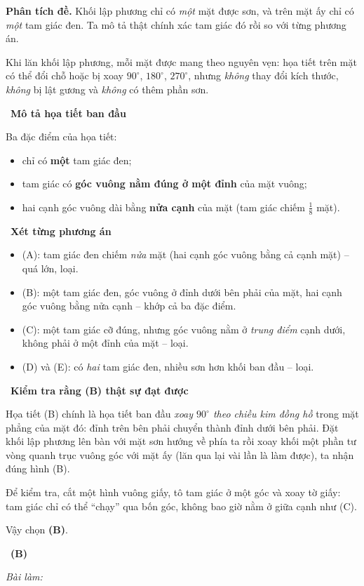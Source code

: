 \documentclass[11pt]{article}
\newif\ifsol \solfalse
\providecommand{\AnsWord}{Đáp số}
\newcommand{\StuProb}[2]{\begin{probboxS}{#1}{#2}\StuProbBody\end{probboxS}}
\newcommand{\ans}[1]{\par\smallskip{\bfseries\color{tmGreen!88!black}\AnsWord:}\ {\bfseries\color{AnsRed}#1}\par}
\newcommand{\probsol}[1]{%
  \begin{lrbox}{\solmeasure}\begin{minipage}{\dimexpr\linewidth-24pt\relax}#1\end{minipage}\end{lrbox}%
  \ifsol
    \begin{solbox}#1\end{solbox}%
  \else
    \setlength{\solht}{\dimexpr\ht\solmeasure+\dp\solmeasure+0.85cm\relax}%
    \ifdim\solht<1.35cm\setlength{\solht}{1.35cm}\fi
    \ifdim\solht>\StudentMaxWork\setlength{\solht}{\StudentMaxWork}\fi
    \par\noindent\begin{minipage}{\linewidth}%
    \expandafter\StuProb\StuProbArgs
    \begin{tcolorbox}[colback=white,colframe=Line,boxrule=0.8pt,arc=5pt,
      left=8pt,right=8pt,top=4pt,bottom=4pt,height=\solht]{\footnotesize\color{Slate}\itshape\WorkWord}\end{tcolorbox}%
    \end{minipage}\par\medskip
  \fi}
\newlength{\StudentMaxWork}\setlength{\StudentMaxWork}{4.5cm}
\newcommand{\step}[2]{\par\smallskip\noindent{\bfseries\color{tmBlue!85!black}\StepWord~#1.}\ {\bfseries #2}\par\nopagebreak}
\def\WorkWord{Bài làm:}
\def\AnsWord{Đáp số}
\def\StepWord{Bước}
\begin{document}
\probsol{
\textbf{Phân tích đề.} Khối lập phương chỉ có \emph{một} mặt được sơn, và trên mặt ấy chỉ có \emph{một} tam giác đen. Ta mô tả thật chính xác tam giác đó rồi so với từng phương án.
\begin{recallbox}Khi lăn khối lập phương, mỗi mặt được mang theo nguyên vẹn: họa tiết trên mặt có thể đổi chỗ hoặc bị xoay $90^\circ$, $180^\circ$, $270^\circ$, nhưng \emph{không} thay đổi kích thước, \emph{không} bị lật gương và \emph{không} có thêm phần sơn.\end{recallbox}
\step{1}{Mô tả họa tiết ban đầu}
Ba đặc điểm của họa tiết:
\begin{itemize}[leftmargin=1.3em,itemsep=0pt,topsep=0pt]
  \item chỉ có \textbf{một} tam giác đen;
  \item tam giác có \textbf{góc vuông nằm đúng ở một đỉnh} của mặt vuông;
  \item hai cạnh góc vuông dài bằng \textbf{nửa cạnh} của mặt (tam giác chiếm $\frac18$ mặt).
\end{itemize}

\step{2}{Xét từng phương án}
\begin{itemize}[leftmargin=1.3em,itemsep=1pt,topsep=0pt]
  \item (A): tam giác đen chiếm \emph{nửa} mặt (hai cạnh góc vuông bằng cả cạnh mặt) -- quá lớn, loại.
  \item (B): một tam giác đen, góc vuông ở đỉnh dưới bên phải của mặt, hai cạnh góc vuông bằng nửa cạnh -- khớp cả ba đặc điểm.
  \item (C): một tam giác cỡ đúng, nhưng góc vuông nằm ở \emph{trung điểm} cạnh dưới, không phải ở một đỉnh của mặt -- loại.
  \item (D) và (E): có \emph{hai} tam giác đen, nhiều sơn hơn khối ban đầu -- loại.
\end{itemize}

\step{3}{Kiểm tra rằng (B) thật sự đạt được}
Họa tiết (B) chính là họa tiết ban đầu \emph{xoay $90^\circ$ theo chiều kim đồng hồ} trong mặt phẳng của mặt đó: đỉnh trên bên phải chuyển thành đỉnh dưới bên phải. Đặt khối lập phương lên bàn với mặt sơn hướng về phía ta rồi xoay khối một phần tư vòng quanh trục vuông góc với mặt ấy (lăn qua lại vài lần là làm được), ta nhận đúng hình (B).
\begin{tipbox}Để kiểm tra, cắt một hình vuông giấy, tô tam giác ở một góc và xoay tờ giấy: tam giác chỉ có thể ``chạy'' qua bốn góc, không bao giờ nằm ở giữa cạnh như (C).\end{tipbox}
Vậy chọn \textbf{(B)}.
\ans{(B)}
}
\end{document}
